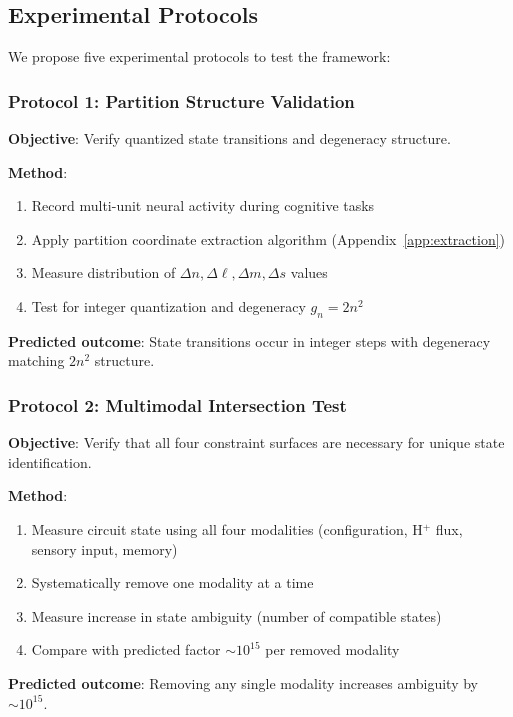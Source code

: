 \documentclass[aps,prd,twocolumn,superscriptaddress,floatfix,nofootinbib]{revtex4-2}
\theoremstyle{remark}
\begin{document}
\subsection{Experimental Protocols}

We propose five experimental protocols to test the framework:

\subsubsection{Protocol 1: Partition Structure Validation}

\textbf{Objective}: Verify quantized state transitions and degeneracy structure.

\textbf{Method}:
\begin{enumerate}
\item Record multi-unit neural activity during cognitive tasks
\item Apply partition coordinate extraction algorithm (Appendix~\ref{app:extraction})
\item Measure distribution of $\Delta n, \Delta \ell, \Delta m, \Delta s$ values
\item Test for integer quantization and degeneracy $g_n = 2n^2$
\end{enumerate}

\textbf{Predicted outcome}: State transitions occur in integer steps with degeneracy matching $2n^2$ structure.

\subsubsection{Protocol 2: Multimodal Intersection Test}

\textbf{Objective}: Verify that all four constraint surfaces are necessary for unique state identification.

\textbf{Method}:
\begin{enumerate}
\item Measure circuit state using all four modalities (configuration, H$^+$ flux, sensory input, memory)
\item Systematically remove one modality at a time
\item Measure increase in state ambiguity (number of compatible states)
\item Compare with predicted factor $\sim 10^{15}$ per removed modality
\end{enumerate}

\textbf{Predicted outcome}: Removing any single modality increases ambiguity by $\sim 10^{15}$.
\end{document}
